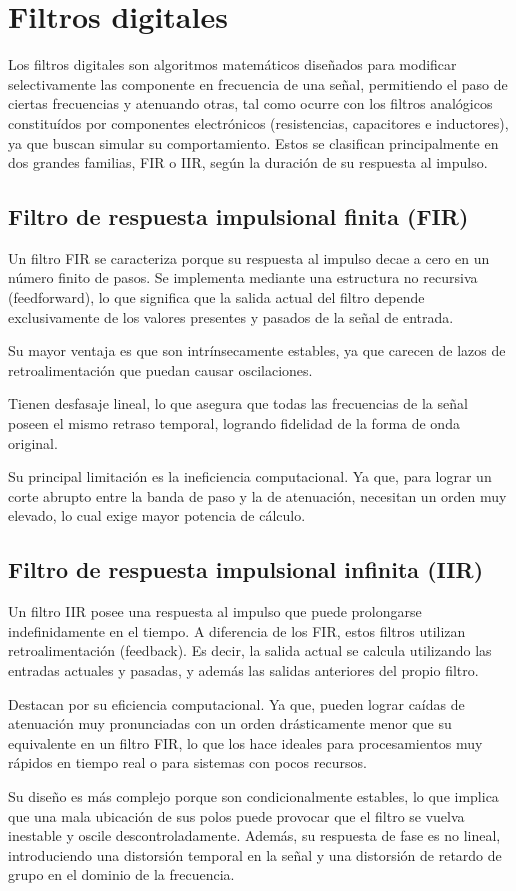 \section{Filtros digitales}
Los filtros digitales son algoritmos matemáticos diseñados para modificar selectivamente las componente en frecuencia de una señal, permitiendo el paso de ciertas frecuencias y atenuando otras, tal como ocurre con los filtros analógicos constituídos por componentes electrónicos (resistencias, capacitores e inductores), ya que buscan simular su comportamiento. Estos se clasifican principalmente en dos grandes familias, FIR o IIR, según la duración de su respuesta al impulso.\par

\subsection{Filtro de respuesta impulsional finita (FIR)}
Un filtro FIR se caracteriza porque su respuesta al impulso decae a cero en un número finito de pasos. Se implementa mediante una estructura no recursiva (feedforward), lo que significa que la salida actual del filtro depende exclusivamente de los valores presentes y pasados de la señal de entrada.\par
Su mayor ventaja es que son intrínsecamente estables, ya que carecen de lazos de retroalimentación que puedan causar oscilaciones.\par
Tienen desfasaje lineal, lo que asegura que todas las frecuencias de la señal poseen el mismo retraso temporal, logrando fidelidad de la forma de onda original.\par
Su principal limitación es la ineficiencia computacional. Ya que, para lograr un corte abrupto entre la banda de paso y la de atenuación, necesitan un orden muy elevado, lo cual exige mayor potencia de cálculo.

\subsection{Filtro de respuesta impulsional infinita (IIR)}
Un filtro IIR posee una respuesta al impulso que puede prolongarse indefinidamente en el tiempo.
A diferencia de los FIR, estos filtros utilizan retroalimentación (feedback). Es decir, la salida actual se calcula utilizando las entradas actuales y pasadas, y además las salidas anteriores del propio filtro.\par
Destacan por su eficiencia computacional. Ya que, pueden lograr caídas de atenuación muy pronunciadas con un orden drásticamente menor que su equivalente en un filtro FIR, lo que los hace ideales para procesamientos muy rápidos en tiempo real o para sistemas con pocos recursos.\par
Su diseño es más complejo porque son condicionalmente estables, lo que implica que una mala ubicación de sus polos puede provocar que el filtro se vuelva inestable y oscile descontroladamente. Además, su respuesta de fase es no lineal, introduciendo una distorsión temporal en la señal y una distorsión de retardo de grupo en el dominio de la frecuencia.


